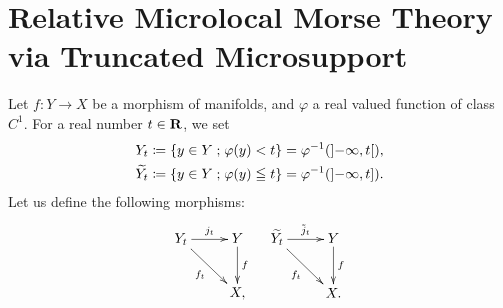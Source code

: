 \section{
  Relative Microlocal Morse Theory via Truncated Microsupport
}

Let \(f\colon Y\to X\) be a morphism of manifolds, and 
\(\varphi\) a real valued function of class \(C^1\). 
For a real number \(t\in \mathbf{R}\), we set 
\begin{align*}
  Y_t
  &\coloneqq \left\{y\in Y\mathrel{;} \varphi(y)< t\right\} 
  = \varphi^{-1}(\mathopen{]}-\infty,t\mathclose{[}),\\
  \widetilde{Y_t}
  &\coloneqq \left\{y\in Y\mathrel{;} \varphi(y)\leqq t\right\} 
  = \varphi^{-1}(\mathopen{]}-\infty,t\mathopen{]}).
\end{align*}
Let us define the following morphisms:
\[\xymatrix{
  Y_t\ar[r]^-{j_t}
  \ar[rd]_-{f_t}
  &
  Y
  \ar[d]^-{f}\\
  &X,
}\quad\xymatrix{
  \widetilde{Y_t}\ar[r]^-{\tilde{j}_t}
  \ar[rd]_-{f_t}
  &
  Y
  \ar[d]^-{f}\\
  &X.
}\]

